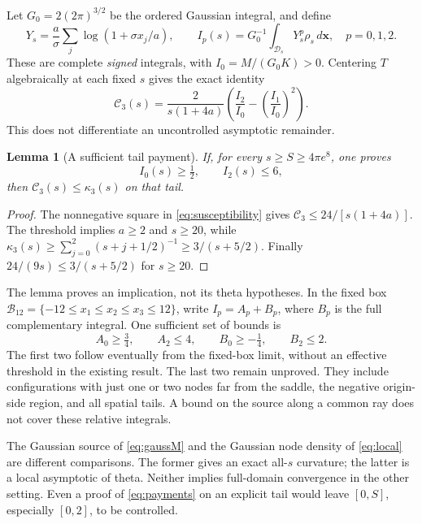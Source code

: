 \documentclass[11pt,letterpaper]{article}
\numberwithin{equation}{section}
\newtheorem{lemma}[proposition]{Lemma}
\theoremstyle{remark}
\newcommand{\dd}{\,d}
\begin{document}
Let $G_0=2(2\pi)^{3/2}$ be the ordered Gaussian integral, and define
\begin{equation}
 Y_s=\frac a\sigma\sum_j\log(1+\sigma x_j/a),\qquad
 I_p(s)=G_0^{-1}\int_{\mathcal D_s}Y_s^p\rho_s\dd\mathbf x,
 \quad p=0,1,2.
\end{equation}
These are complete \emph{signed} integrals, with $I_0=M/(G_0K)>0$.
Centering $T$ algebraically at each fixed $s$ gives the exact identity
\begin{equation}
 \mathcal C_3(s)=\frac{2}{s(1+4a)}
       \left(\frac{I_2}{I_0}-\left(\frac{I_1}{I_0}\right)^2\right).
 \label{eq:susceptibility}
\end{equation}
This does not differentiate an uncontrolled asymptotic remainder.

\begin{lemma}[A sufficient tail payment]
If, for every $s\ge S\ge4\pi e^8$, one proves
\begin{equation}
 I_0(s)\ge\tfrac12,\qquad I_2(s)\le6, \label{eq:payments}
\end{equation}
then $\mathcal C_3(s)\le\kappa_3(s)$ on that tail.
\end{lemma}
\begin{proof}
The nonnegative square in \eqref{eq:susceptibility} gives
$\mathcal C_3\le24/[s(1+4a)]$. The threshold implies $a\ge2$ and
$s\ge20$, while
$\kappa_3(s)\ge\sum_{j=0}^2(s+j+1/2)^{-1}\ge3/(s+5/2)$.
Finally $24/(9s)\le3/(s+5/2)$ for $s\ge20$.
\end{proof}

The lemma proves an implication, not its theta hypotheses. In the
fixed box $\mathcal B_{12}=\{-12\le x_1\le x_2\le x_3\le12\}$,
write $I_p=A_p+B_p$, where $B_p$ is the full complementary integral.
One sufficient set of bounds is
\begin{equation}
 A_0\ge\tfrac34,\qquad A_2\le4,\qquad
 B_0\ge-\tfrac14,\qquad B_2\le2. \label{eq:fourpayments}
\end{equation}
The first two follow eventually from the fixed-box limit, without an
effective threshold in the existing result. The last two remain
unproved. They include configurations with just one or two nodes far
from the saddle, the negative origin-side region, and all spatial
tails. A bound on the source along a common ray does not cover these
relative integrals.

The Gaussian source of \eqref{eq:gaussM} and the Gaussian node density
of \eqref{eq:local} are different comparisons. The former gives an
exact all-$s$ curvature; the latter is a local asymptotic of theta.
Neither implies full-domain convergence in the other setting.
Even a proof of \eqref{eq:payments} on an explicit tail would leave
$[0,S]$, especially $[0,2]$, to be controlled.
\end{document}
